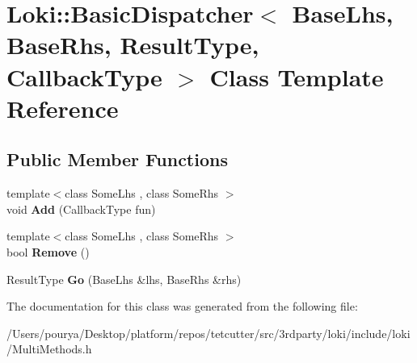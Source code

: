 \hypertarget{classLoki_1_1BasicDispatcher}{}\section{Loki\+:\+:Basic\+Dispatcher$<$ Base\+Lhs, Base\+Rhs, Result\+Type, Callback\+Type $>$ Class Template Reference}
\label{classLoki_1_1BasicDispatcher}
\subsection*{Public Member Functions}
\begin{DoxyCompactItemize}
\item 
\hypertarget{classLoki_1_1BasicDispatcher_abeeaf4bd086be466b336fd7bb3c61890}{}{\footnotesize template$<$class Some\+Lhs , class Some\+Rhs $>$ }\\void {\bfseries Add} (Callback\+Type fun)\label{classLoki_1_1BasicDispatcher_abeeaf4bd086be466b336fd7bb3c61890}

\item 
\hypertarget{classLoki_1_1BasicDispatcher_a164f1ab577af0a3f35e00a8ab942c2e5}{}{\footnotesize template$<$class Some\+Lhs , class Some\+Rhs $>$ }\\bool {\bfseries Remove} ()\label{classLoki_1_1BasicDispatcher_a164f1ab577af0a3f35e00a8ab942c2e5}

\item 
\hypertarget{classLoki_1_1BasicDispatcher_a40ae49c3492f48c1153d7fc68f695289}{}Result\+Type {\bfseries Go} (Base\+Lhs \&lhs, Base\+Rhs \&rhs)\label{classLoki_1_1BasicDispatcher_a40ae49c3492f48c1153d7fc68f695289}

\end{DoxyCompactItemize}


The documentation for this class was generated from the following file\+:\begin{DoxyCompactItemize}
\item 
/\+Users/pourya/\+Desktop/platform/repos/tetcutter/src/3rdparty/loki/include/loki/Multi\+Methods.\+h\end{DoxyCompactItemize}
